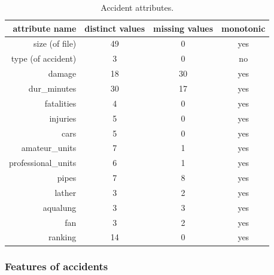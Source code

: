 \begin{table}
\centering
\begin{tabular}{|r||c|c|c|}
\hline
\textbf{attribute name} & \textbf{distinct values} & \textbf{missing values} & \textbf{monotonic}\\
\hline
\hline
size (of file) & 49 & 0 & yes\\
\hline
type (of accident) & 3 & 0 & no\\
\hline
damage & 18 & 30 & yes\\
\hline
dur\_minutes & 30 & 17 & yes\\
\hline
fatalities & 4 & 0 & yes\\
\hline
injuries & 5 & 0 & yes\\
\hline
cars & 5 & 0 & yes\\
\hline
amateur\_units & 7 & 1 & yes\\
\hline
professional\_units & 6 & 1 & yes\\
\hline
pipes & 7 & 8 & yes\\
\hline
lather & 3 & 2 & yes\\
\hline
aqualung & 3 & 3 & yes\\
\hline
fan & 3 & 2 & yes\\
\hline
ranking & 14 & 0 & yes\\
\hline
\end{tabular}

\caption{Accident attributes.}
\label{fig:data_attributes_description}
\end{table}


\subsubsection{Features of accidents} \label{sec:data_features}


